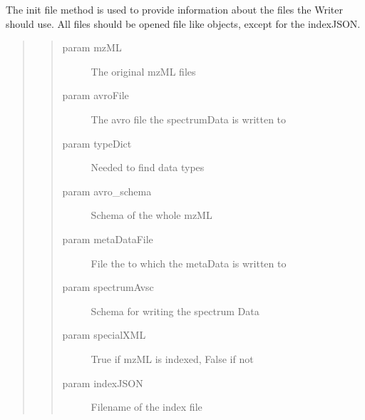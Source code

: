 \documentclass[letterpaper,10pt,english]{sphinxmanual}
\begin{document}
\begin{fulllineitems}
\begin{fulllineitems}
\begin{quote}
\begin{quote}
\begin{description}
\end{description}\end{quote}
\end{quote}

\end{fulllineitems}


\begin{fulllineitems}
\label{mzMLWriter:mzMLWriter.mzMLWriter.init_file}
The init file method is used to provide information about the files the Writer should use. All files should be
opened file like objects, except for the indexJSON.
\begin{quote}
\begin{quote}\begin{description}
\item[{param mzML}] \leavevmode
The original mzML files

\item[{param avroFile}] \leavevmode
The avro file the spectrumData is written to

\item[{param typeDict}] \leavevmode
Needed to find data types

\item[{param avro\_schema}] \leavevmode
Schema of the whole mzML

\item[{param metaDataFile}] \leavevmode
File the to which the metaData is written to

\item[{param spectrumAvsc}] \leavevmode
Schema for writing the spectrum Data

\item[{param specialXML}] \leavevmode
True if mzML is indexed, False if not

\item[{param indexJSON}] \leavevmode
Filename of the index file

\end{description}\end{quote}
\end{quote}

\end{fulllineitems}



\end{fulllineitems}
\end{document}

